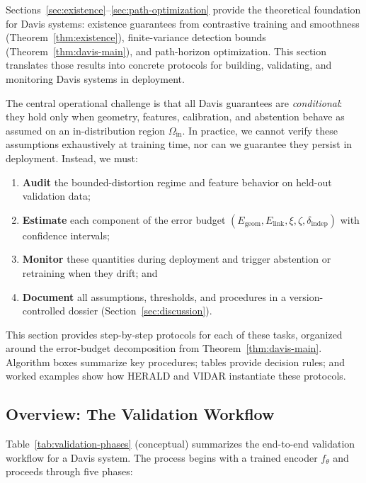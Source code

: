 \documentclass[11pt]{article}
\theoremstyle{remark}
\theoremstyle{plain}
\begin{document}
Sections~\ref{sec:existence}--\ref{sec:path-optimization} provide the theoretical foundation for Davis systems: existence guarantees from contrastive training and smoothness (Theorem~\ref{thm:existence}), finite-variance detection bounds (Theorem~\ref{thm:davis-main}), and path-horizon optimization. This section translates those results into concrete protocols for building, validating, and monitoring Davis systems in deployment.

The central operational challenge is that all Davis guarantees are \emph{conditional}: they hold only when geometry, features, calibration, and abstention behave as assumed on an in-distribution region $\Omega_{\mathrm{in}}$. In practice, we cannot verify these assumptions exhaustively at training time, nor can we guarantee they persist in deployment. Instead, we must:
\begin{enumerate}[label=(\roman*),leftmargin=*]
  \item \textbf{Audit} the bounded-distortion regime and feature behavior on held-out validation data;
  \item \textbf{Estimate} each component of the error budget $(E_{\mathrm{geom}}, E_{\mathrm{link}}, \xi, \zeta, \delta_{\mathrm{indep}})$ with confidence intervals;
  \item \textbf{Monitor} these quantities during deployment and trigger abstention or retraining when they drift; and
  \item \textbf{Document} all assumptions, thresholds, and procedures in a version-controlled dossier (Section~\ref{sec:discussion}).
\end{enumerate}

This section provides step-by-step protocols for each of these tasks, organized around the error-budget decomposition from Theorem~\ref{thm:davis-main}. Algorithm boxes summarize key procedures; tables provide decision rules; and worked examples show how HERALD and VIDAR instantiate these protocols.

\subsection{Overview: The Validation Workflow}
\label{subsec:ops-overview}

Table~\ref{tab:validation-phases} (conceptual) summarizes the end-to-end validation workflow for a Davis system. The process begins with a trained encoder $f_\theta$ and proceeds through five phases:
\end{document}
